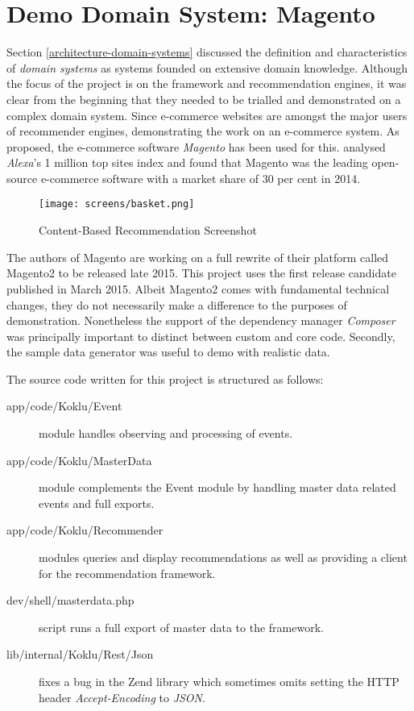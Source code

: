 \section{Demo Domain System: Magento}

Section \ref{architecture-domain-systems} discussed the definition and characteristics of \emph{domain systems} as systems founded on extensive domain knowledge. Although the focus of the project is on the framework and recommendation engines, it was clear from the beginning that they needed to be trialled and demonstrated on a complex domain system. Since e-commerce websites are amongst the major users of recommender engines, demonstrating the work on an e-commerce system. As proposed, the e-commerce software \emph{Magento} has been used for this. \citet{aheadworks14} analysed \emph{Alexa}'s 1 million top sites index and found that Magento was the leading open-source e-commerce software with a market share of 30 per cent in 2014.

\begin{figure}[!ht]
    \texttt{[image: screens/basket.png]}
    \caption{Content-Based Recommendation Screenshot}
    \label{fig:implementation-magento-basket}
\end{figure}

The authors of Magento are working on a full rewrite of their platform called Magento2 to be released late 2015. This project uses the first release candidate published in March 2015. Albeit Magento2 comes with fundamental technical changes, they do not necessarily make a difference to the purposes of demonstration. Nonetheless the support of the dependency manager \emph{Composer} was principally important to distinct between custom and core code. Secondly, the sample data generator was useful to demo with realistic data.

The source code written for this project is structured as follows:

\begin{description}
    \item[app/code/Koklu/Event] module handles observing and processing of events.
    \item[app/code/Koklu/MasterData] module complements the Event module by handling master data related events and full exports.
    \item[app/code/Koklu/Recommender] modules queries and display recommendations as well as providing a client for the recommendation framework.
    \item[dev/shell/masterdata.php] script runs a full export of master data to the framework.
    \item[lib/internal/Koklu/Rest/Json] fixes a bug in the Zend library which sometimes omits setting the HTTP header \emph{Accept-Encoding} to \emph{JSON}.
\end{description}

